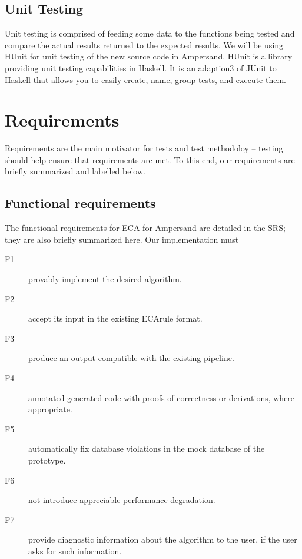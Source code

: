 \documentclass[12pt]{report}
\begin{document}


\subsection{Unit Testing}\label{subsec:UnitTest}
Unit testing is comprised of feeding some data to the functions being tested and
compare the actual results returned to the expected results.
We will be using HUnit for unit testing of the new source code 
in Ampersand. HUnit is a 
library providing unit testing capabilities in Haskell.  It is an adaption3
of 
JUnit to Haskell that allows you to easily create, name, group tests, and 
execute them.

\section{Requirements}\label{sec:Reqs}
Requirements are the main motivator for tests and test methodoloy -- testing
should help ensure that requirements are met. To this end, our requirements are
briefly summarized and labelled below.

\subsection{Functional requirements}\label{subsec:FunReqs}
The functional requirements for ECA for Ampersand are detailed in the SRS; they
are also briefly summarized here. Our implementation must

\begin{description}
\item[F1] provably implement the desired algorithm.
\item[F2] accept its input in the existing ECArule format.
\item[F3] produce an output compatible with the existing pipeline. 
\item[F4] annotated 
generated code with proofs of correctness or derivations,
where appropriate. 
\item[F5] automatically fix database violations in the mock database of the
prototype.
\item[F6] not introduce appreciable performance degradation. 
\item[F7] provide diagnostic information about the algorithm to
the user, if the user asks for such information.
\end{description}
\end{document}
